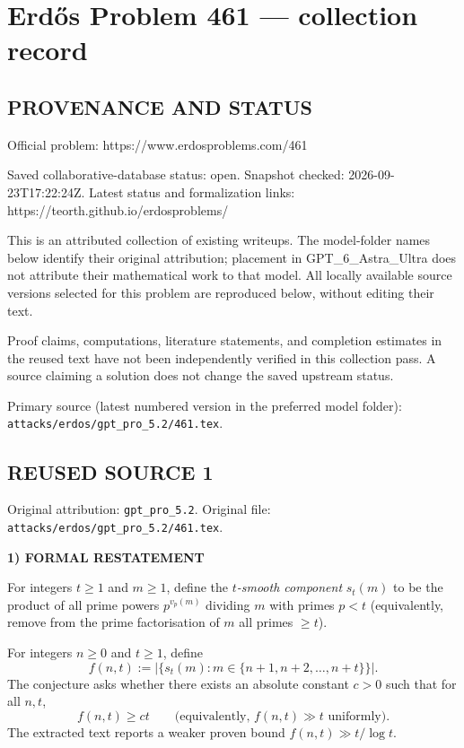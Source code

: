 \section*{Erd\H{o}s Problem 461 --- collection record}

\subsection*{PROVENANCE AND STATUS}
Official problem: https://www.erdosproblems.com/461

Saved collaborative-database status: open.
Snapshot checked: 2026-09-23T17:22:24Z.
Latest status and formalization links: https://teorth.github.io/erdosproblems/

This is an attributed collection of existing writeups. The model-folder names below identify their original attribution; placement in GPT\_6\_Astra\_Ultra does not attribute their mathematical work to that model. All locally available source versions selected for this problem are reproduced below, without editing their text.

Proof claims, computations, literature statements, and completion estimates in the reused text have not been independently verified in this collection pass. A source claiming a solution does not change the saved upstream status.

Primary source (latest numbered version in the preferred model folder): \texttt{attacks/erdos/gpt\_pro\_5.2/461.tex}.

\subsection*{REUSED SOURCE 1}
Original attribution: \texttt{gpt\_pro\_5.2}.
Original file: \texttt{attacks/erdos/gpt\_pro\_5.2/461.tex}.


\noindent\textbf{1) FORMAL RESTATEMENT}

For integers $t\ge 1$ and $m\ge 1$, define the \emph{$t$-smooth component} $s_t(m)$ to be the product of all prime powers $p^{v_p(m)}$ dividing $m$ with primes $p<t$ (equivalently, remove from the prime factorisation of $m$ all primes $\ge t$).

For integers $n\ge 0$ and $t\ge 1$, define
\[f(n,t):=\left|\{s_t(m): m\in\{n+1,n+2,\dots,n+t\}\}\right|.
\]
The conjecture asks whether there exists an absolute constant $c>0$ such that for all $n,t$,
\[f(n,t)\ge c t\qquad\text{(equivalently, }f(n,t)\gg t\text{ uniformly).}
\]
The extracted text reports a weaker proven bound $f(n,t)\gg t/\log t$.

